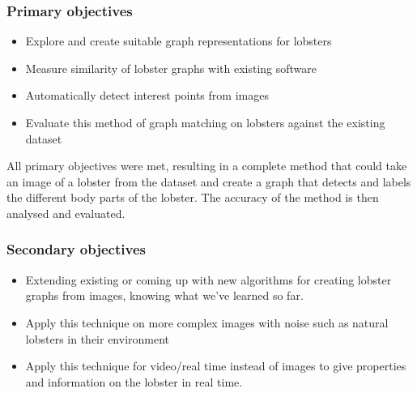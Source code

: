 \subsubsection{Primary objectives}
\begin{itemize}
\item Explore and create suitable graph representations for lobsters
\item Measure similarity of lobster graphs with existing software
\item Automatically detect interest points from images
\item Evaluate this method of graph matching on lobsters against the existing dataset
\end{itemize}
All primary objectives were met, resulting in a complete method that could take an image of a lobster from the dataset and create a graph that detects and labels the different body parts of the lobster. The accuracy of the method is then analysed and evaluated.
 
\subsubsection{Secondary objectives}
\begin{itemize}
\item Extending existing or coming up with new algorithms for creating lobster graphs from images, knowing what we've learned so far.
\item Apply this technique on more complex images with noise such as natural lobsters  in their environment
\item Apply this technique for video/real time instead of images to give properties and information on the lobster in real time. 
\end{itemize}
